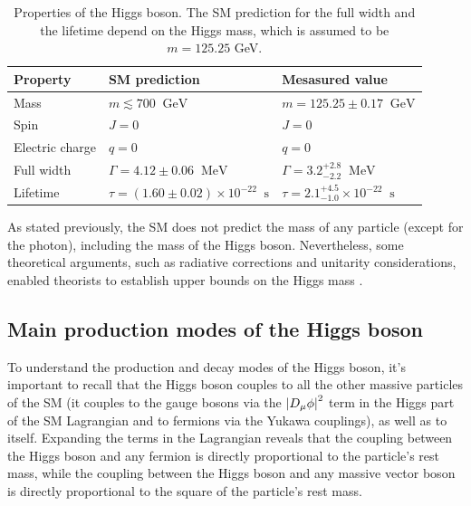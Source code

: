\begin{table}[ht]
    \centering
    \begin{tabular}{|l|l|l|}
        \hline
        \cellcolor{lightgray}Property & \cellcolor{lightgray}SM prediction & \cellcolor{lightgray}Mesasured value \\ \hline
        Mass                & $m \lesssim 700 \;\; \text{GeV}$ & $m = 125.25 \pm 0.17 \;\; \text{GeV}$             \\
        Spin                &  $J=0$ & $J=0$                                             \\
        Electric charge     & $q=0$  & $q=0$                                             \\
        Full width          & $\Gamma = 4.12 \pm 0.06 \;\;  \text{MeV}$  & $\Gamma = 3.2^{+2.8}_{-2.2} \;\;  \text{MeV}$     \\
        Lifetime            & $\tau = (1.60 \pm 0.02) \times 10^{-22} \;\;  \text{s}$  & $\tau = 2.1^{+4.5}_{-1.0} \times 10^{-22} \;\;  \text{s}$   \\ \hline
    \end{tabular}
    \caption{Properties of the Higgs boson. The SM prediction for the full width and the lifetime depend on the Higgs mass, which is assumed to be $m = 125.25$ GeV.}
    \label{tab:higgs_properties}
\end{table}

As stated previously, the SM does not predict the mass of any particle (except for the photon), including the mass of the Higgs boson. Nevertheless, some theoretical arguments, such as radiative corrections and unitarity considerations, enabled theorists to establish upper bounds on the Higgs mass \cite{Djouadi:2005gi}.

\subsection{Main production modes of the Higgs boson}\label{subsec:higgs_production}

To understand the production and decay modes of the Higgs boson, it's important to recall that the Higgs boson couples to all the other massive particles of the SM (it couples to the gauge bosons via the $\left\lvert D_{\mu}\phi\right\rvert^2$ term in the Higgs part of the SM Lagrangian and to fermions via the Yukawa couplings), as well as to itself. Expanding the terms in the Lagrangian reveals that the coupling between the Higgs boson and any fermion is directly proportional to the particle's rest mass, while the coupling between the Higgs boson and any massive vector boson is directly proportional to the square of the particle's rest mass.

